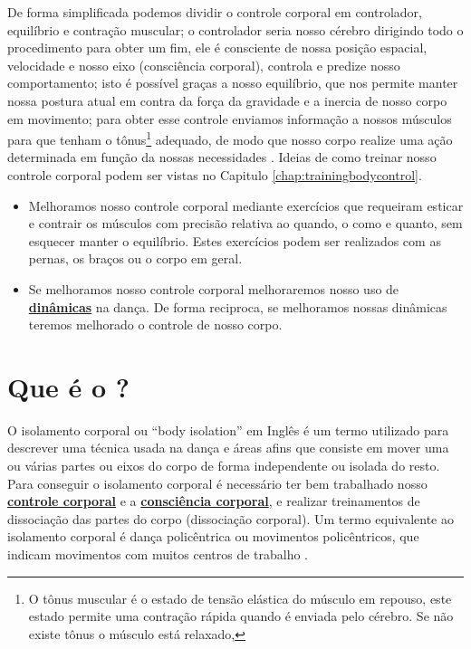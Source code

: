 De forma simplificada podemos dividir o controle corporal em controlador, equilíbrio e contração muscular;
o controlador seria nosso cérebro dirigindo todo o procedimento para obter um fim,
ele é consciente de nossa posição espacial, velocidade e nosso eixo (consciência corporal), 
controla e predize nosso comportamento; isto é possível graças a nosso equilíbrio,
que nos permite manter nossa postura atual em contra da força da gravidade e a inercia de nosso corpo em movimento;
para obter esse controle enviamos informação a nossos músculos para que tenham o 
tônus\footnote{O tônus muscular é o estado de tensão elástica do músculo em repouso,
este estado permite uma contração rápida quando é enviada pelo cérebro.
Se não existe tônus o músculo está relaxado,} adequado,
de modo que nosso corpo realize uma ação determinada em função da nossas necessidades
 \cite[pp. 17]{bolio2006fantasia}.
Ideias de como treinar nosso controle corporal podem ser vistas no Capitulo \ref{chap:trainingbodycontrol}.


\begin{tcbattention}
\begin{itemize}
\item Melhoramos nosso controle corporal mediante exercícios que requeiram
esticar e contrair os músculos com precisão relativa ao quando, o como e quanto, 
sem esquecer manter o equilíbrio.
Estes exercícios podem ser realizados com as pernas, os braços ou o corpo em geral.
\item Se melhoramos nosso controle corporal melhoraremos nosso uso de 
\hyperref[sec:musicalidade:dinamicas]{\textbf{dinâmicas}} na dança.
De forma reciproca, se melhoramos nossas dinâmicas teremos melhorado o controle de nosso corpo.
\end{itemize}
\end{tcbattention}
\section{Que é o \bodyisolation?}
\label{sec:BodyIsolation}


O isolamento corporal ou ``body isolation'' em Inglês é um termo utilizado
para descrever uma técnica usada na dança e áreas afins que 
consiste em mover uma ou várias partes ou eixos do corpo
de forma independente ou isolada do resto.
Para conseguir o isolamento corporal é necessário ter bem trabalhado nosso 
\hyperref[sec:BodyControl]{\textbf{controle corporal}} e a
\hyperref[sec:BodyAwareness]{\textbf{consciência corporal}},
e realizar treinamentos de dissociação das partes do corpo (dissociação corporal).
Um termo equivalente ao isolamento corporal é dança policêntrica ou movimentos policêntricos,
que indicam movimentos com muitos centros de trabalho \cite[pp. 25]{grob2020dance}.

